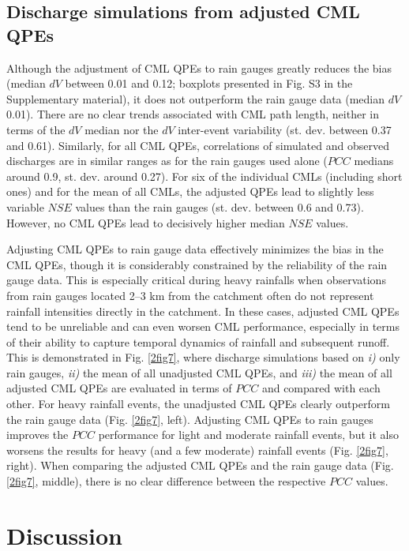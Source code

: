 \documentclass{ctuthesis}\usepackage[]{graphicx}\usepackage[]{color}
\begin{document}
\subsection{Discharge simulations from adjusted CML QPEs}

Although the adjustment of CML QPEs to rain gauges greatly reduces the bias (median $dV$ between 0.01 and 0.12; boxplots presented in Fig. S3 in the Supplementary material), it does not outperform the rain gauge data (median $dV$ 0.01). There are no clear trends associated with CML path length, neither in terms of the $dV$ median nor the $dV$ inter-event variability (st. dev. between 0.37 and 0.61). Similarly, for all CML QPEs, correlations of simulated and observed discharges are in similar ranges as for the rain gauges used alone ($PCC$ medians around 0.9, st. dev. around 0.27). For six of the individual CMLs (including short ones) and for the mean of all CMLs, the adjusted QPEs lead to slightly less variable $NSE$ values than the rain gauges (st. dev. between 0.6 and 0.73). However, no CML QPEs lead to decisively higher median $NSE$ values.



Adjusting CML QPEs to rain gauge data effectively minimizes the bias in the CML QPEs, though it is considerably constrained by the reliability of the rain gauge data. This is especially critical during heavy rainfalls when observations from rain gauges located 2--3 km from the catchment often do not represent rainfall intensities directly in the catchment. In these cases, adjusted CML QPEs tend to be unreliable and can even worsen CML performance, especially in terms of their ability to capture temporal dynamics of rainfall and subsequent runoff. This is demonstrated in Fig. \ref{2fig7}, where discharge simulations based on \emph{i)} only rain gauges, \emph{ii)} the mean of all unadjusted CML QPEs, and \emph{iii)} the mean of all adjusted CML QPEs are evaluated in terms of $PCC$ and compared with each other. For heavy rainfall events, the unadjusted CML QPEs clearly outperform the rain gauge data (Fig. \ref{2fig7}, left). Adjusting CML QPEs to rain gauges improves the $PCC$ performance for light and moderate rainfall events, but it also worsens the results for heavy (and a few moderate) rainfall events (Fig. \ref{2fig7}, right). When comparing the adjusted CML QPEs and the rain gauge data (Fig. \ref{2fig7}, middle), there is no clear difference between the respective $PCC$ values.

\section{Discussion}
\end{document}
